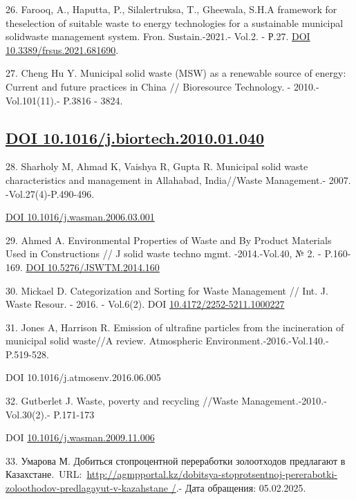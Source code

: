 26. Farooq, A., Haputta, P., Silalertruksa, T., Gheewala, S.H.A
framework for theselection of suitable waste to energy technologies for
a sustainable municipal solidwaste management system. Fron.
Sustain.-2021.- Vol.2. - Р.27.
\href{https://doi.org/10.3389/frsus.2021.681690}{DOI
10.3389/frsus.2021.681690}.

27. Cheng Hu Y. Municipal solid waste (MSW) as a renewable source of
energy: Current and future practices in China // Bioresource Technology.
- 2010.-Vol.101(11).- P.3816 - 3824.

\subsection{\texorpdfstring{\href{https://doi.org/10.1016/j.biortech.2010.01.040}{DOI
10.1016/j.biortech.2010.01.040}}{DOI 10.1016/j.biortech.2010.01.040}}\label{doi-10.1016j.biortech.2010.01.040}

28. Sharholy M, Ahmad K, Vaishya R, Gupta R. Municipal solid waste
characteristics and management in Allahabad, India//Waste Management.-
2007. -Vol.27(4)-P.490-496.

\href{https://doi.org/10.1016/j.wasman.2006.03.001}{DOI
10.1016/j.wasman.2006.03.001}

29. Ahmed A. Environmental Properties of Waste and By Product Materials
Used in Constructions // J solid waste techno mgmt. -2014.-Vol.40, № 2.
- P.160-169. \href{https://doi.org/10.5276/JSWTM.2014.160}{DOI
10.5276/JSWTM.2014.160}

30. Mickael D. Categorization and Sorting for Waste Management // Int.
J. Waste Resour. - 2016. - Vol.6(2). DOI
\href{http://dx.doi.org/10.4172/2252-5211.1000227}{10.4172/2252-5211.1000227}

31. Jones A, Harrison R. Emission of ultrafine particles from the
incineration of municipal solid waste//A review. Atmospheric
Environment.-2016.-Vol.140.-P.519-528.

DOI 10.1016/j.atmosenv.2016.06.005

32. Gutberlet J. Waste, poverty and recycling //Waste
Management.-2010.-Vol.30(2).- P.171-173

DOI
\href{http://dx.doi.org/10.1016/j.wasman.2009.11.006}{10.1016/j.wasman.2009.11.006}

33. Умарова М. Добиться стопроцентной переработки золоотходов предлагают
в
Казахстане.~URL:~\href{http://agmpportal.kz/dobitsya-stoprotsentnoj-pererabotki-zoloothodov-predlagayut-v-kazahstane\%20/}{http://agmpportal.kz/dobitsya-stoprotsentnoj-pererabotki-zoloothodov-predlagayut-v-kazahstane
/}.- Дата обращения: 05.02.2025.

